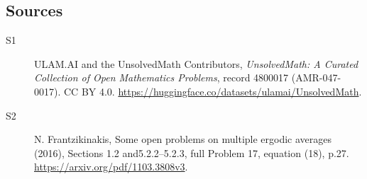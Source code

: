 \documentclass[11pt]{article}
\begin{document}
\subsection{Sources}
\begin{description}
\item[\hypertarget{source:4800017:1}{S1}] ULAM.AI and the UnsolvedMath Contributors, \emph{UnsolvedMath: A Curated Collection of Open Mathematics Problems}, record 4800017 (AMR-047-0017). CC BY 4.0. \url{https://huggingface.co/datasets/ulamai/UnsolvedMath}.
\item[\hypertarget{source:4800017:2}{S2}] N. Frantzikinakis, Some open problems on multiple ergodic averages (2016), Sections 1.2 and5.2.2--5.2.3, full Problem 17, equation (18), p.27. \url{https://arxiv.org/pdf/1103.3808v3}.
\end{description}
\label{end:4800017}
\end{document}
